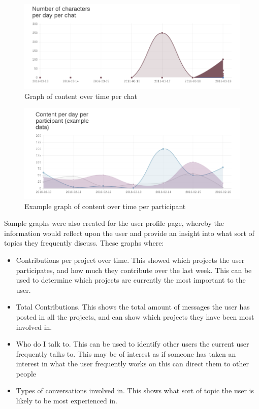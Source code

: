 \documentclass{l4proj}
\begin{document}
\begin{figure}[h]
\includegraphics[scale=0.75]{WorkingGraph.png}
\centering
\caption{Graph of content over time per chat}
\label{fig:3}
\end{figure}


\begin{figure}[h]
\includegraphics[scale=0.75]{SampleGraph.png}
\centering
\caption{Example graph of content over time per participant}
\label{fig:4}

\end{figure}

\newpage
Sample graphs were also created for the user profile page, whereby the information would reflect upon the user and provide an insight into what sort of topics they frequently discuss. These graphs where:

\begin{itemize}
\item Contributions per project over time.  This showed which projects the user participates, and how much they contribute over the last week.  This can be used to determine which projects are currently the most important to the user.
\item Total Contributions.  This shows the total amount of messages the user has posted in all the projects, and can show which projects they have been most involved in.
\item Who do I talk to.  This can be used to identify other users the current user frequently talks to.  This may be of interest as if someone has taken an interest in what the user frequently works on this can direct them to other people
\item Types of conversations involved in.  This shows what sort of topic the user is likely to be most experienced in. 
\end{itemize}
\end{document}
